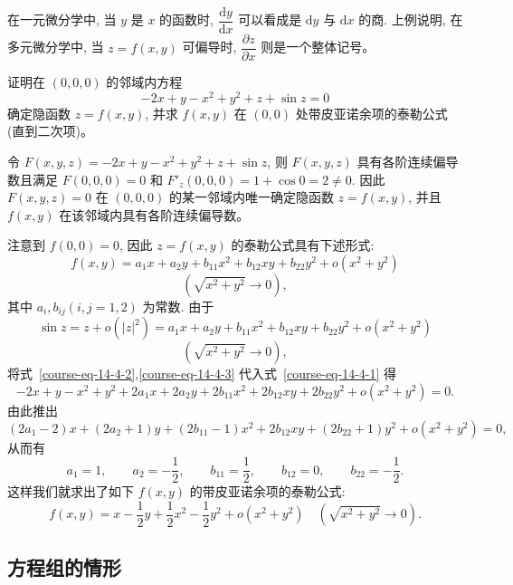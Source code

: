 \documentclass[UTF8,12pt,a4paper,fontset=fandol]{ctexart}
\begin{document}
\begin{remark}\quad 在一元微分学中, 当 $y$ 是 $x$ 的函数时, $\dfrac{\mathrm dy}{\mathrm dx}$ 可以看成是 $\mathrm dy$ 与 $\mathrm dx$ 的商. 上例说明, 在多元微分学中, 当 $z=f(x,y)$ 可偏导时, $\dfrac{\partial z}{\partial x}$ 则是一个整体记号。

\end{remark}
\begin{example}\label{course-example-14-4-2}\quad 证明在 $(0,0,0)$ 的邻域内方程
\begin{equation}
  -2x+y-x^2+y^2+z+\sin z=0
  \label{course-eq-14-4-1}
\end{equation}
确定隐函数 $z=f(x,y)$, 并求 $f(x,y)$ 在 $(0,0)$ 处带皮亚诺余项的泰勒公式 (直到二次项)。

\end{example}
\begin{solve}\quad 令 $F(x,y,z)=-2x+y-x^2+y^2+z+\sin z$, 则 $F(x,y,z)$ 具有各阶连续偏导数且满足 $F(0,0,0)=0$ 和 $F'_z(0,0,0)=1+\cos0=2\ne0$. 因此 $F(x,y,z)=0$ 在 $(0,0,0)$ 的某一邻域内唯一确定隐函数 $z=f(x,y)$, 并且 $f(x,y)$ 在该邻域内具有各阶连续偏导数。

注意到 $f(0,0)=0$, 因此 $z=f(x,y)$ 的泰勒公式具有下述形式:
\begin{equation}
  f(x,y)=a_1x+a_2y+b_{11}x^2+b_{12}xy+b_{22}y^2+o(x^2+y^2)
  \label{course-eq-14-4-2}
\end{equation}
\[
  (\sqrt{x^2+y^2}\to0),
\]
其中 $a_i,b_{ij}(i,j=1,2)$ 为常数. 由于
\begin{equation}\label{course-eq-14-4-3}
  \sin z=z+o(|z|^2)
  =a_1x+a_2y+b_{11}x^2+b_{12}xy+b_{22}y^2+o(x^2+y^2)
\end{equation}
\[
  (\sqrt{x^2+y^2}\to0),
\]
将式~\eqref{course-eq-14-4-2},\eqref{course-eq-14-4-3}  代入式~\eqref{course-eq-14-4-1}  得
\[
  -2x+y-x^2+y^2+2a_1x+2a_2y+2b_{11}x^2+2b_{12}xy+2b_{22}y^2+o(x^2+y^2)=0.
\]
由此推出
\[
  (2a_1-2)x+(2a_2+1)y+(2b_{11}-1)x^2
  +2b_{12}xy+(2b_{22}+1)y^2+o(x^2+y^2)=0,
\]
从而有
\[
  a_1=1,\qquad a_2=-\frac12,\qquad b_{11}=\frac12,\qquad
  b_{12}=0,\qquad b_{22}=-\frac12.
\]
这样我们就求出了如下 $f(x,y)$ 的带皮亚诺余项的泰勒公式:
\[
  f(x,y)=x-\frac12y+\frac12x^2-\frac12y^2+o(x^2+y^2)
  \quad(\sqrt{x^2+y^2}\to0).
\]

\end{solve}
\subsection{方程组的情形}
\end{document}
